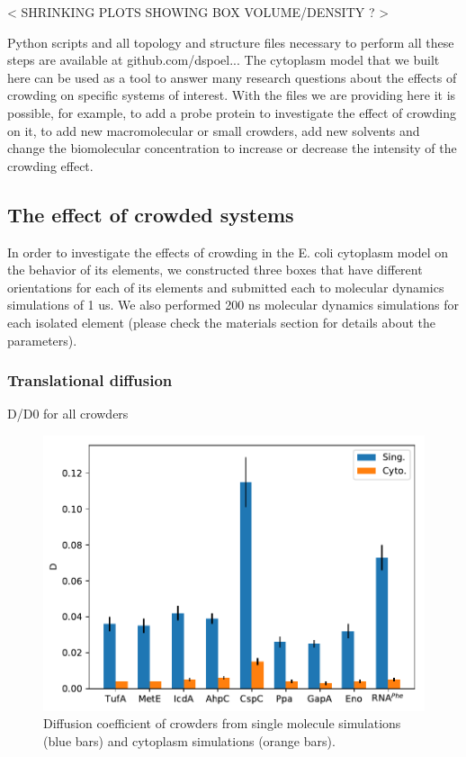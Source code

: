 \documentclass[journal=jacsat,manuscript=article]{achemso}
\begin{document}
< SHRINKING PLOTS SHOWING BOX VOLUME/DENSITY ? >


Python scripts and all topology and structure files necessary to perform all these steps are available at github.com/dspoel... The cytoplasm model that we built here can be used as a tool to answer many research questions about the effects of crowding on specific systems of interest. With the files we are providing here it is possible, for example, to add a probe protein to investigate the effect of crowding on it, to add new macromolecular or small crowders, add new solvents and change the biomolecular concentration to increase or decrease the intensity of the crowding effect.
 


\subsection{The effect of crowded systems}

In order to investigate the effects of crowding in the E. coli cytoplasm model on the behavior of its elements, we constructed three boxes that have different orientations for each of its elements and submitted each to molecular dynamics simulations of 1 us. We also performed 200 ns molecular dynamics simulations for each isolated element (please check the materials section for details about the parameters).

\subsubsection{Translational diffusion}
D/D0 for all crowders

\begin{figure}
\includegraphics[scale=0.6]{msd.pdf}
\caption{Diffusion coefficient of crowders from single molecule simulations (blue bars) and cytoplasm simulations (orange bars).}
\end{figure}
\end{document}
